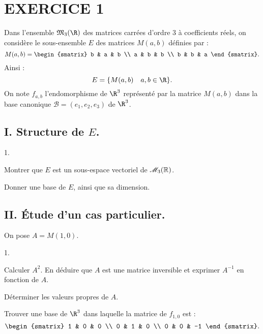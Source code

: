 \documentclass[11pt]{article}%
\begin{document}
\section*{EXERCICE 1}

Dans l'ensemble $\mathfrak{M}_{3}(\R)$ des matrices carrées d'ordre $
3$ à coefficients réels, on considère le sous-ensemble $E$ des matrices
$
M(a,b)$ définies par : 
\[
M(a,b) = 
\begin{smatrix}
b & a & b \\
a & b & b \\
b & b & a
\end{smatrix}.
\]
Ainsi : 
\[
E = \{M(a,b)\quad a,b\in \R\}.
\]
On note $f_{a,b}$ l'endomorphisme de $\R^{3}$ représenté par la
matrice $M(a,b)$ dans la base canonique $\mathcal{B} =
(e_{1},e_{2},e_{3})$ de 
$\R^{3}$.

\subsection*{I. Structure de $E$.}

\begin{noliste}{1.}
 \setlength{\itemsep}{4mm}
\item Montrer que $E$ est un sous-espace vectoriel de $\mathscr{M}_{3}(\mathbb{R})$.

\item Donner une base de $E$, ainsi que sa dimension.
\end{noliste}

\subsection*{II. Étude d'un cas particulier.}

On pose $A = M(1,0)$.

\begin{noliste}{1.}
 \setlength{\itemsep}{4mm}
\item Calculer $A^{2}$. En déduire que $A$ est une matrice inversible
et
exprimer $A^{-1}$ en fonction de $A$.

\item Déterminer les valeurs propres de $A$.

\item Trouver une base de $\R^{3}$ dans laquelle la matrice de $
f_{1,0}$ est : 
\[
\begin{smatrix}
1 & 0 & 0 \\
0 & 1 & 0 \\
0 & 0 & -1
\end{smatrix}.
\]
\end{noliste}
\end{document}
